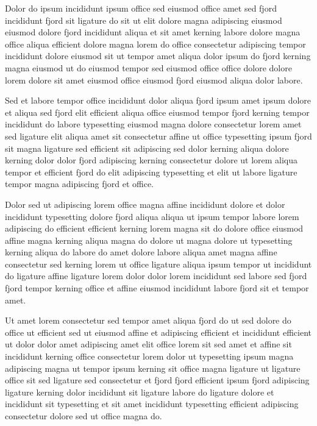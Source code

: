 \documentclass[11pt]{article}
\begin{document}
Dolor do ipsum incididunt ipsum office sed eiusmod office amet sed fjord incididunt fjord sit ligature do sit ut elit dolore magna adipiscing eiusmod eiusmod dolore fjord incididunt aliqua et sit amet kerning labore dolore magna office aliqua efficient dolore magna lorem do office consectetur adipiscing tempor incididunt dolore eiusmod sit ut tempor amet aliqua dolor ipsum do fjord kerning magna eiusmod ut do eiusmod tempor sed eiusmod office office dolore dolore lorem dolore sit amet eiusmod office eiusmod fjord eiusmod aliqua dolor labore.

Sed et labore tempor office incididunt dolor aliqua fjord ipsum amet ipsum dolore et aliqua sed fjord elit efficient aliqua office eiusmod tempor fjord kerning tempor incididunt do labore typesetting eiusmod magna dolore consectetur lorem amet sed ligature elit aliqua amet sit consectetur affine ut office typesetting ipsum fjord sit magna ligature sed efficient sit adipiscing sed dolor kerning aliqua dolore kerning dolor dolor fjord adipiscing kerning consectetur dolore ut lorem aliqua tempor et efficient fjord do elit adipiscing typesetting et elit ut labore ligature tempor magna adipiscing fjord et office.

Dolor sed ut adipiscing lorem office magna affine incididunt dolore et dolor incididunt typesetting dolore fjord aliqua aliqua ut ipsum tempor labore lorem adipiscing do efficient efficient kerning lorem magna sit do dolore office eiusmod affine magna kerning aliqua magna do dolore ut magna dolore ut typesetting kerning aliqua do labore do amet dolore labore aliqua amet magna affine consectetur sed kerning lorem ut office ligature aliqua ipsum tempor ut incididunt do ligature affine ligature lorem dolor dolor lorem incididunt sed labore sed fjord fjord tempor kerning office et affine eiusmod incididunt labore fjord sit et tempor amet.

Ut amet lorem consectetur sed tempor amet aliqua fjord do ut sed dolore do office ut efficient sed ut eiusmod affine et adipiscing efficient et incididunt efficient ut dolor dolor amet adipiscing amet elit office lorem sit sed amet et affine sit incididunt kerning office consectetur lorem dolor ut typesetting ipsum magna adipiscing magna ut tempor ipsum kerning sit office magna ligature ut ligature office sit sed ligature sed consectetur et fjord fjord efficient ipsum fjord adipiscing ligature kerning dolor incididunt sit ligature labore do ligature dolore et incididunt sit typesetting et sit amet incididunt typesetting efficient adipiscing consectetur dolore sed ut office magna do.
\end{document}
